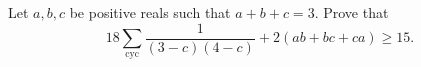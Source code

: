 Let $a, b, c$ be positive reals such that $a+b+c=3$. Prove that \[18\sum_{\text{cyc}}\frac{1}{(3-c)(4-c)}+2(ab+bc+ca)\ge 15. \]